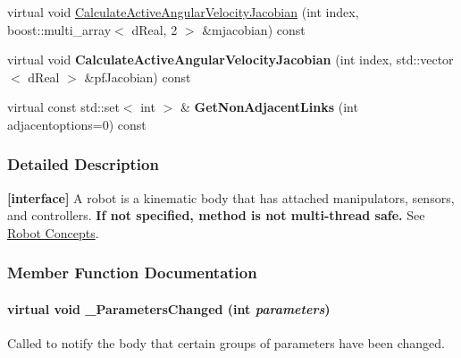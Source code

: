 \begin{DoxyCompactItemize}
\item 
virtual void \hyperlink{classOpenRAVE_1_1RobotBase_a86ad4866d727f58a05ffd898ff411ee0}{CalculateActiveAngularVelocityJacobian} (int index, boost::multi\_\-array$<$ dReal, 2 $>$ \&mjacobian) const 
\item 
\hypertarget{classOpenRAVE_1_1RobotBase_a2d4889bd0db8c8aad99c992b13cc2db7}{
virtual void {\bfseries CalculateActiveAngularVelocityJacobian} (int index, std::vector$<$ dReal $>$ \&pfJacobian) const }
\label{classOpenRAVE_1_1RobotBase_a2d4889bd0db8c8aad99c992b13cc2db7}

\item 
\hypertarget{classOpenRAVE_1_1RobotBase_a0dfdf7668c68c2860a27983804e90c8b}{
virtual const std::set$<$ int $>$ \& {\bfseries GetNonAdjacentLinks} (int adjacentoptions=0) const }
\label{classOpenRAVE_1_1RobotBase_a0dfdf7668c68c2860a27983804e90c8b}

\end{DoxyCompactItemize}


\subsubsection{Detailed Description}
{\bfseries \mbox{[}interface\mbox{]}} A robot is a kinematic body that has attached manipulators, sensors, and controllers. {\bfseries If not specified, method is not multi-\/thread safe.} See \hyperlink{arch__robot}{Robot Concepts}. 

\subsubsection{Member Function Documentation}
\hypertarget{classOpenRAVE_1_1RobotBase_a218a09068212db7bb35c7d4ce792e309}{
\paragraph[{\_\-ParametersChanged}]{\setlength{\rightskip}{0pt plus 5cm}virtual void \_\-ParametersChanged (int {\em parameters})}\hfill}
\label{classOpenRAVE_1_1RobotBase_a218a09068212db7bb35c7d4ce792e309}


Called to notify the body that certain groups of parameters have been changed. 

